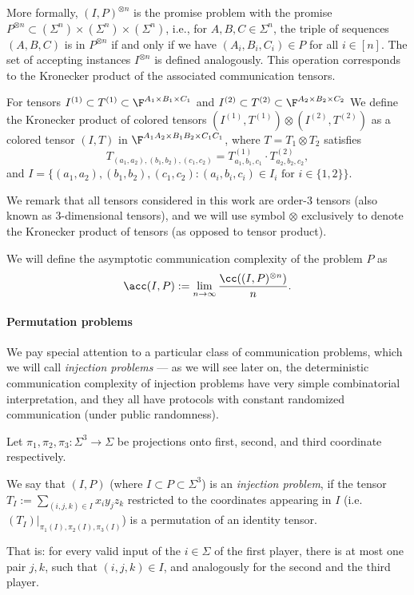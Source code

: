 More formally, $(I, P)^{\otimes n}$ is the promise problem with the promise $P^{\otimes n} \subset (\Sigma^n) \times (\Sigma^n) \times (\Sigma^n)$, i.e., for $A,B,C \in \Sigma^n$, the triple of sequences $(A, B, C)$ is in $P^{\otimes n}$ if and only if we have $(A_i, B_i, C_i) \in P$ for all $i \in [n]$. The set of accepting instances $I^{\otimes n}$ is defined analogously. This operation corresponds to the Kronecker product of the associated communication tensors.
\begin{definition}
    For tensors $I^{(1)} \subset T^{(1)} \subset \F^{A_1 \times B_1 \times C_1}$ and $I^{(2)} \subset T^{(2)} \subset \F^{A_2 \times B_2 \times C_2}$ We define the Kronecker product of colored tensors $(I^{(1)}, T^{(1)}) \otimes (I^{(2)}, T^{(2)})$ as a colored tensor $(I, T)$ in $\F^{A_1 A_2 \times B_1 B_2 \times C_1 C_1}$, where $T = T_1 \otimes T_2$ satisfies 
    \begin{equation*}
    T_{(a_1,a_2), (b_1, b_2), (c_1, c_2)} = T^{(1)}_{a_1,b_1,c_1} \cdot T^{(2)}_{a_2,b_2,c_2},
    \end{equation*}
    and $I = \{(a_1, a_2), (b_1, b_2), (c_1, c_2) : (a_i, b_i, c_i) \in I_i \text{ for } i \in \{1,2\}\}$.
\end{definition}

We remark that all tensors considered in this work are order-3 tensors (also known as 3-dimensional tensors), and we will use symbol $\otimes$ exclusively to denote the Kronecker product of tensors (as opposed to tensor product).

We will define the asymptotic communication complexity of the problem $P$ as
\begin{equation*}
    \acc(I,P) := \lim_{n\to\infty} \frac{\cc( (I, P)^{\otimes n})}{n}.
\end{equation*}

\paragraph{Permutation problems}
We pay special attention to a particular class of communication problems, which we will call \emph{injection problems} --- as we will see later on, the deterministic communication complexity of injection problems have very simple combinatorial interpretation, and they all have protocols with constant randomized communication (under public randomness).

\begin{definition}
    Let $\pi_1, \pi_2, \pi_3 : \Sigma^3 \to \Sigma$ be projections onto first, second, and third coordinate respectively.
    
    We say that $(I, P)$ (where $I \subset P \subset \Sigma^3$) is an \emph{injection problem},
    if the tensor $T_I := \sum_{(i,j,k) \in I} x_i y_j z_k$  restricted to the coordinates appearing in $I$ (i.e. $(T_I)|_{\pi_1(I), \pi_2(I), \pi_3(I)}$) is a permutation of an identity tensor.
    
    That is: for every valid input of the $i \in \Sigma$ of the first player, there is at most one pair $j, k$, such that $(i,j,k) \in I$, and analogously for the second and the third player.
\end{definition}

